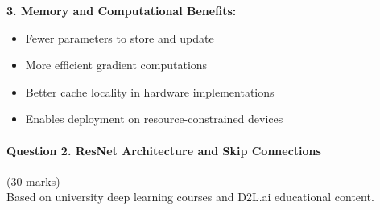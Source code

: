 \documentclass[12pt]{article}
\begin{document}
\begin{enumerate}[(a)]
{    \textbf{3. Memory and Computational Benefits:}
    \begin{itemize}
        \item Fewer parameters to store and update
        \item More efficient gradient computations
        \item Better cache locality in hardware implementations
        \item Enables deployment on resource-constrained devices
    \end{itemize}
    }
\end{enumerate}

\newpage
\paragraph{Question 2. ResNet Architecture and Skip Connections}\hfill (30 marks)\\
Based on university deep learning courses and D2L.ai educational content.
\end{document}
